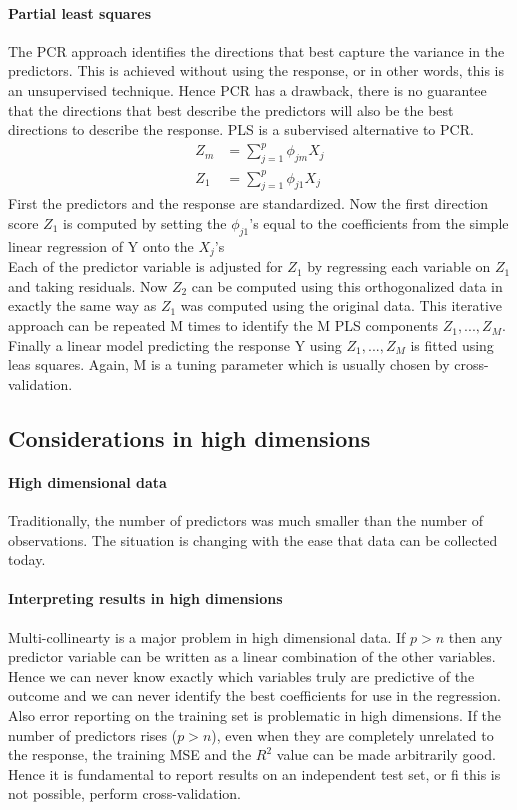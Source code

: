 \documentclass[../document.tex]{subfiles}
\begin{document}
	\paragraph{Partial least squares}
	The PCR approach identifies the directions that best capture the variance in the predictors. This is achieved without using the response, or in other words, this is an unsupervised technique. Hence PCR has a drawback, there is no guarantee that the directions that best describe the predictors will also be the best directions to describe the response. PLS is a subervised alternative to PCR.
	\begin{equation}
	\begin{split}
		Z_{m}&=\sum_{j=1}^{p}\phi_{jm}X_{j}\\
		Z_{1}&=\sum_{j=1}^{p}\phi_{j1}X_{j}
	\end{split}
	\end{equation}
	First the predictors and the response are standardized. Now the first direction score \(Z_{1}\) is computed by setting the \(\phi_{j1}\)'s equal to the coefficients from the simple linear regression of Y onto the \(X_{j}\)'s\\
	Each of the predictor variable is adjusted for \(Z_{1}\) by regressing each variable on \(Z_{1}\) and taking residuals. Now \(Z_{2}\) can be computed using this orthogonalized data in exactly the same way as \(Z_{1}\) was computed using the original data. This iterative approach can be repeated M times to identify the M PLS components \(Z_{1},...,Z_{M}\). Finally a linear model predicting the response Y using \(Z_{1},...,Z_{M}\) is fitted using leas squares. Again, M is a tuning parameter which is usually chosen by cross-validation.
	\subsection{Considerations in high dimensions}
	\paragraph{High dimensional data}
	Traditionally, the number of predictors was much smaller than the number of observations. The situation is changing with the ease that data can be collected today.
	\paragraph{Interpreting results in high dimensions}
	Multi-collinearty is a major problem in high dimensional data. If \(p>n\) then any predictor variable can be written as a linear combination of the other variables. Hence we can never know exactly which variables truly are predictive of the outcome and we can never identify the best coefficients for use in the regression. Also error reporting on the training set is problematic in high dimensions. If the number of predictors rises (\(p>n\)), even when they are completely unrelated to the response, the training MSE and the \(R^2\) value can be made arbitrarily good. Hence it is fundamental to report results on an independent test set, or fi this is not possible, perform cross-validation.
\end{document}
